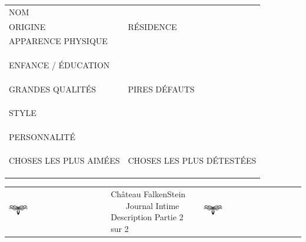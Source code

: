 \documentclass[a5paper,pagesize,french]{book}
\begin{document}
\begin{tabular}[c]{ p{} p{} }
	NOM						&									\\
	ORIGINE					&		RÉSIDENCE					\\
	APPARENCE PHYSIQUE		&									\\
							&									\\
							&									\\
							&									\\
	ENFANCE / ÉDUCATION		&									\\
							&									\\
							&									\\
							&									\\
	GRANDES QUALITÉS		&		PIRES DÉFAUTS				\\
							&									\\
							&									\\
							&									\\
	STYLE					&									\\
							&									\\
							&									\\
							&									\\
	PERSONNALITÉ			&									\\
							&									\\
							&									\\
							&									\\
	CHOSES LES PLUS AIMÉES	&		CHOSES LES PLUS DÉTESTÉES	\\
							&									\\
							&									\\
							&									\\
\end{tabular}

\clearpage

\begin{center}
	\begin{tabular}[c]{ p{} p{} p{} }
		\includegraphics[width=0.20\textwidth]{../../images/artsdecos/ornement04whiteBG.png} & 
			\centering
			{ \Huge{\setmainfont{Chomsky} Château FalkenStein } }~\newline~\newline~\newline
			{ \LARGE{ \setmainfont{Z003} Journal Intime } }
			{ \Large{ \setmainfont{Z003} Description Partie 2 sur 2} }
		& \includegraphics[width=0.20\textwidth]{../../images/artsdecos/ornement04whiteBG.png} \\
	\end{tabular}
\end{center}
\end{document}
